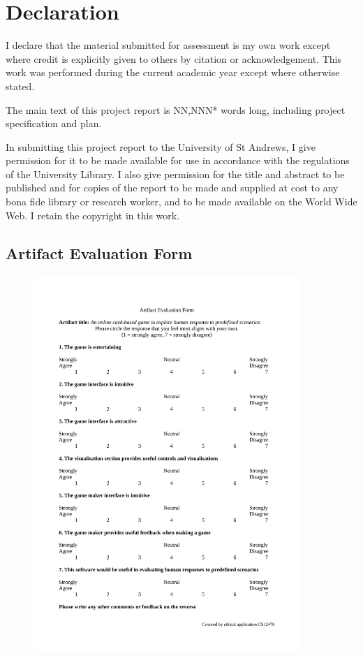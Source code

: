 \documentclass[]{report}
\begin{document}
\chapter{Declaration}
I declare that the material submitted for
assessment is my own work except where credit is
explicitly given to others by citation or
acknowledgement. This work was performed during
the current academic year except where otherwise
stated.

The main text of this project report is  NN,NNN* words long, including project specification and plan.

In submitting this project report to the University of
St Andrews, I give permission for it to be made
available for use in accordance with the regulations of
the University Library. I also give permission for
the title and abstract to be published and for copies of
the report to be made and supplied at cost to any bona
fide library or research worker, and to be made
available on the World Wide Web. I retain the
copyright in this work.

\listoftodos











\nocite{*}
\printbibliography

\begin{appendices}
  \section{Artifact Evaluation Form}
  \begin{figure}[!h]
    \centering
    \includegraphics[width=0.9\textwidth]{./appendices/feedback.pdf}
    \label{appendix:artifact_eval}
  \end{figure}
\end{appendices}
\end{document}
